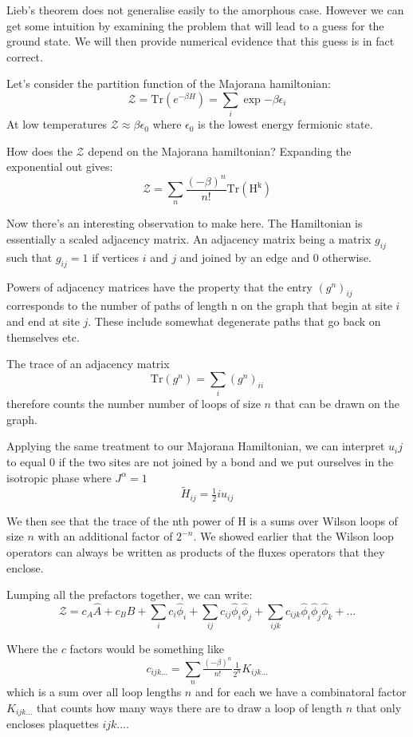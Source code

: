 Lieb's theorem does not generalise easily to the amorphous case. However
we can get some intuition by examining the problem that will lead to a
guess for the ground state. We will then provide numerical evidence that
this guess is in fact correct.

Let's consider the partition function of the Majorana hamiltonian:
\[ \mathcal{Z} = \mathrm{Tr}\left( e^{-\beta H}\right) = \sum_i \exp{-\beta \epsilon_i}\]
At low temperatures \(\mathcal{Z} \approx \beta \epsilon_0\) where
\(\epsilon_0\) is the lowest energy fermionic state.

How does the \(\mathcal{Z}\) depend on the Majorana hamiltonian?
Expanding the exponential out gives:
\[ \mathcal{Z} = \sum_n \frac{(-\beta)^n}{n!} \mathrm{Tr(H^k)} \]

Now there's an interesting observation to make here. The Hamiltonian is
essentially a scaled adjacency matrix. An adjacency matrix being a
matrix \(g_{ij}\) such that \(g_{ij} = 1\) if vertices \(i\) and \(j\)
and joined by an edge and 0 otherwise.

Powers of adjacency matrices have the property that the entry
\((g^n)_{ij}\) corresponds to the number of paths of length n on the
graph that begin at site \(i\) and end at site \(j\). These include
somewhat degenerate paths that go back on themselves etc.

The trace of an adjacency matrix
\[\mathrm{Tr}(g^n) = \sum_i (g^n)_{ii}\] therefore counts the number
number of loops of size \(n\) that can be drawn on the graph.

Applying the same treatment to our Majorana Hamiltonian, we can
interpret \(u_ij\) to equal 0 if the two sites are not joined by a bond
and we put ourselves in the isotropic phase where \(J^\alpha = 1\)
\[ \tilde{H}_{ij} =  \tfrac{1}{2} i u_{ij}\]

We then see that the trace of the nth power of H is a sums over Wilson
loops of size \(n\) with an additional factor of \(2^{-n}\). We showed
earlier that the Wilson loop operators can always be written as products
of the fluxes operators that they enclose.

Lumping all the prefactors together, we can write:
\[ \mathcal{Z} = c_A \hat{A} + c_B \hat{B} + \sum_i c_i \hat{\phi}_i + \sum_{ij} c_{ij}  \hat{\phi}_i \hat{\phi}_j + \sum_{ijk} c_{ijk}  \hat{\phi}_i \hat{\phi}_j \hat{\phi}_k + ...\]

Where the \(c\) factors would be something like
\[c_{ijk...} = \sum_n \tfrac{(-\beta)^n}{n!} \tfrac{1}{2^n} K_{ijk...}\]
which is a sum over all loop lengths \(n\) and for each we have a
combinatoral factor \(K_{ijk...}\) that counts how many ways there are
to draw a loop of length \(n\) that only encloses plaquettes \(ijk...\).

